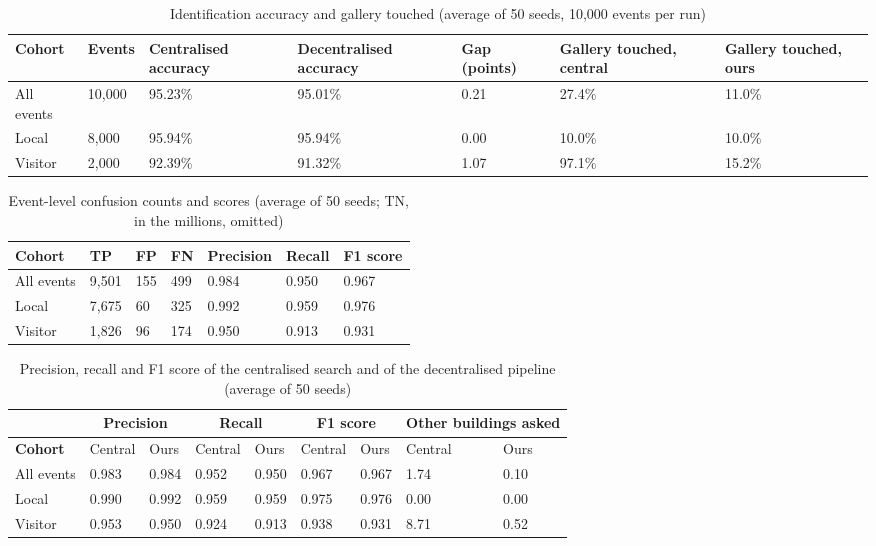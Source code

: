 \documentclass[12pt,a4paper,oneside]{report}
\begin{document}
\begin{table}[htbp]
\centering
\caption{Identification accuracy and gallery touched (average of 50 seeds, 10,000 events per run)}\label{tab:central}
{\small\setlength{\tabcolsep}{4pt}\renewcommand{\arraystretch}{1.2}
\begin{tabular}{|p{2.5cm}|p{1.4cm}|p{2.1cm}|p{2.3cm}|p{1.3cm}|p{1.9cm}|p{1.9cm}|}\hline
\textbf{Cohort} & \textbf{Events} & \textbf{Centralised accuracy} & \textbf{Decentralised accuracy} & \textbf{Gap (points)} & \textbf{Gallery touched, central} & \textbf{Gallery touched, ours}\\\hline
All events & 10,000 & 95.23\% & 95.01\% & 0.21 & 27.4\% & 11.0\%\\\hline
Local & 8,000 & 95.94\% & 95.94\% & 0.00 & 10.0\% & 10.0\%\\\hline
Visitor & 2,000 & 92.39\% & 91.32\% & 1.07 & 97.1\% & 15.2\%\\\hline
\end{tabular}}
\end{table}

\begin{table}[htbp]
\centering
\caption{Event-level confusion counts and scores (average of 50 seeds; TN, in the millions, omitted)}\label{tab:events}
{\small\setlength{\tabcolsep}{4pt}\renewcommand{\arraystretch}{1.2}
\begin{tabular}{|p{2.97cm}|p{1.78cm}|p{1.48cm}|p{1.48cm}|p{1.98cm}|p{1.78cm}|p{1.58cm}|}\hline
\textbf{Cohort} & \textbf{TP} & \textbf{FP} & \textbf{FN} & \textbf{Precision} & \textbf{Recall} & \textbf{F1 score}\\\hline
All events & 9,501 & 155 & 499 & 0.984 & 0.950 & 0.967\\\hline
Local & 7,675 & 60 & 325 & 0.992 & 0.959 & 0.976\\\hline
Visitor & 1,826 & 96 & 174 & 0.950 & 0.913 & 0.931\\\hline
\end{tabular}}
\end{table}

\begin{table}[htbp]
\centering
\caption{Precision, recall and F1 score of the centralised search and of the decentralised pipeline (average of 50 seeds)}\label{tab:censcores}
{\small\setlength{\tabcolsep}{3pt}\renewcommand{\arraystretch}{1.2}
\begin{tabular}{|p{3.0cm}|p{1.2cm}|p{1.2cm}|p{1.2cm}|p{1.2cm}|p{1.2cm}|p{1.2cm}|p{1.2cm}|p{1.2cm}|}\hline
 & \multicolumn{2}{c|}{\textbf{Precision}} & \multicolumn{2}{c|}{\textbf{Recall}} & \multicolumn{2}{c|}{\textbf{F1 score}} & \multicolumn{2}{c|}{\textbf{Other buildings asked}}\\\hline
\textbf{Cohort} & Central & Ours & Central & Ours & Central & Ours & Central & Ours\\\hline
All events & 0.983 & 0.984 & 0.952 & 0.950 & 0.967 & 0.967 & 1.74 & 0.10\\\hline
Local & 0.990 & 0.992 & 0.959 & 0.959 & 0.975 & 0.976 & 0.00 & 0.00\\\hline
Visitor & 0.953 & 0.950 & 0.924 & 0.913 & 0.938 & 0.931 & 8.71 & 0.52\\\hline
\end{tabular}}
\end{table}
\end{document}
